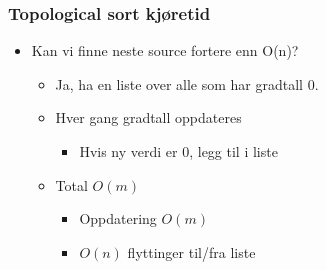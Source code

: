 \documentclass{article}
\begin{document}
    \subsubsection{Topological sort kjøretid}
    \begin{itemize}
        \item Kan vi finne neste source fortere enn O(n)?
            \begin{itemize}
                \item Ja, ha en liste over alle som har gradtall 0.
                \item Hver gang gradtall oppdateres
                    \begin{itemize}
                        \item Hvis ny verdi er 0, legg til i liste
                    \end{itemize}
                \item Total \( O(m) \)
                    \begin{itemize}
                        \item Oppdatering \( O(m) \)
                        \item \( O(n) \) flyttinger til/fra liste
                    \end{itemize}
            \end{itemize}
    \end{itemize}
\end{document}
